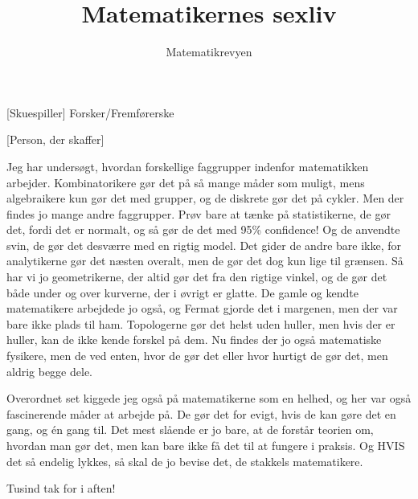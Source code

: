 \documentclass[a4paper,11pt]{article}
\title{Matematikernes sexliv}
\author{Matematikrevyen}
\begin{document}
\maketitle

\begin{roles}
[Skuespiller] Forsker/Fremførerske
\end{roles}

\begin{props}
[Person, der skaffer]
\end{props}

\begin{sketch}

 Jeg har undersøgt, hvordan forskellige faggrupper indenfor matematikken arbejder. Kombinatorikere gør det på så mange måder som muligt, mens algebraikere kun gør det med grupper, og de diskrete gør det på cykler. Men der findes jo mange andre faggrupper. Prøv bare at tænke på statistikerne, de gør det, fordi det er normalt, og så gør de det med 95\% confidence! Og de anvendte svin, de gør det desværre med en rigtig model. Det gider de andre bare ikke, for analytikerne gør det næsten overalt, men de gør det dog kun lige til grænsen. Så har vi jo geometrikerne, der altid gør det fra den rigtige vinkel, og de gør det både under og over kurverne, der i øvrigt er glatte. De gamle og kendte matematikere arbejdede jo også, og Fermat gjorde det i margenen, men der var bare ikke plads til ham. Topologerne gør det helst uden huller, men hvis der er huller, kan de ikke kende forskel på dem. Nu findes der jo også matematiske fysikere, men de ved enten, hvor de gør det eller hvor hurtigt de gør det, men aldrig begge dele.

 Overordnet set kiggede jeg også på matematikerne som en helhed, og her var også fascinerende måder at arbejde på. De gør det for evigt, hvis de kan gøre det en gang, og én gang til. Det mest slående er jo bare, at de forstår teorien om, hvordan man gør det, men kan bare ikke få det til at fungere i praksis. Og HVIS det så endelig lykkes, så skal de jo bevise det, de stakkels matematikere.

 Tusind tak for i aften!
\end{sketch}
\end{document}
